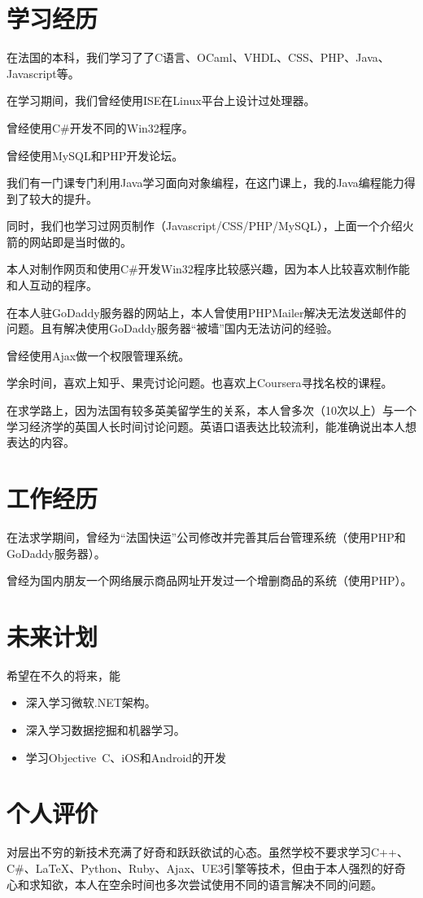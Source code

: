 \documentclass[UTF8]{ctexart}
\begin{document}
\section{学习经历}
在法国的本科，我们学习了了C语言、OCaml、VHDL、CSS、PHP、Java、Javascript等。

在学习期间，我们曾经使用ISE在Linux平台上设计过处理器。

曾经使用C\#{}开发不同的Win32程序。

曾经使用MySQL和PHP开发论坛。

我们有一门课专门利用Java学习面向对象编程，在这门课上，我的Java编程能力得到了较大的提升。

同时，我们也学习过网页制作（Javascript/CSS/PHP/MySQL），上面一个介绍火箭的网站即是当时做的。

本人对制作网页和使用C\#{}开发Win32程序比较感兴趣，因为本人比较喜欢制作能和人互动的程序。

在本人驻GoDaddy服务器的网站上，本人曾使用PHPMailer解决无法发送邮件的问题。且有解决使用GoDaddy服务器“被墙”国内无法访问的经验。

曾经使用Ajax做一个权限管理系统。

学余时间，喜欢上知乎、果壳讨论问题。也喜欢上Coursera寻找名校的课程。

在求学路上，因为法国有较多英美留学生的关系，本人曾多次（10次以上）与一个学习经济学的英国人长时间讨论问题。英语口语表达比较流利，能准确说出本人想表达的内容。
\section{工作经历}
在法求学期间，曾经为“法国快运”公司修改并完善其后台管理系统（使用PHP和GoDaddy服务器）。

曾经为国内朋友一个网络展示商品网址开发过一个增删商品的系统（使用PHP）。
\section{未来计划}
希望在不久的将来，能
\begin{itemize}
\item 深入学习微软.NET架构。
\item 深入学习数据挖掘和机器学习。
\item 学习Objective\ C、iOS和Android的开发
\end{itemize}
\section{个人评价}
对层出不穷的新技术充满了好奇和跃跃欲试的心态。虽然学校不要求学习C++、C\#{}、\LaTeX{}、Python、Ruby、Ajax、UE3引擎等技术，但由于本人强烈的好奇心和求知欲，本人在空余时间也多次尝试使用不同的语言解决不同的问题。
\end{document}
